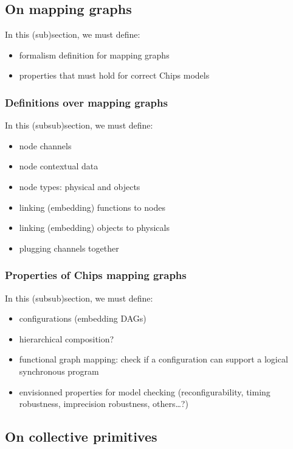 \documentclass{article}
\begin{document}
\subsection{On mapping graphs}

In this (sub)section, we must define:
\begin{itemize}
    \item formalism definition for mapping graphs
    \item properties that must hold for correct Chips models
\end{itemize}

\subsubsection{Definitions over mapping graphs}

In this (subsub)section, we must define:
\begin{itemize}
    \item node channels
    \item node contextual data
    \item node types: physical and objects
    \item linking (embedding) functions to nodes
    \item linking (embedding) objects to physicals
    \item plugging channels together
\end{itemize}


\subsubsection{Properties of Chips mapping graphs}

In this (subsub)section, we must define:
\begin{itemize}
    \item configurations (embedding DAGs)
    \item hierarchical composition?
    \item functional graph mapping: check if a configuration can support a logical synchronous program
    \item envisionned properties for model checking (reconfigurability, timing robustness, imprecision robustness, others\ldots?)
\end{itemize}

\subsection{On collective primitives}
\end{document}

